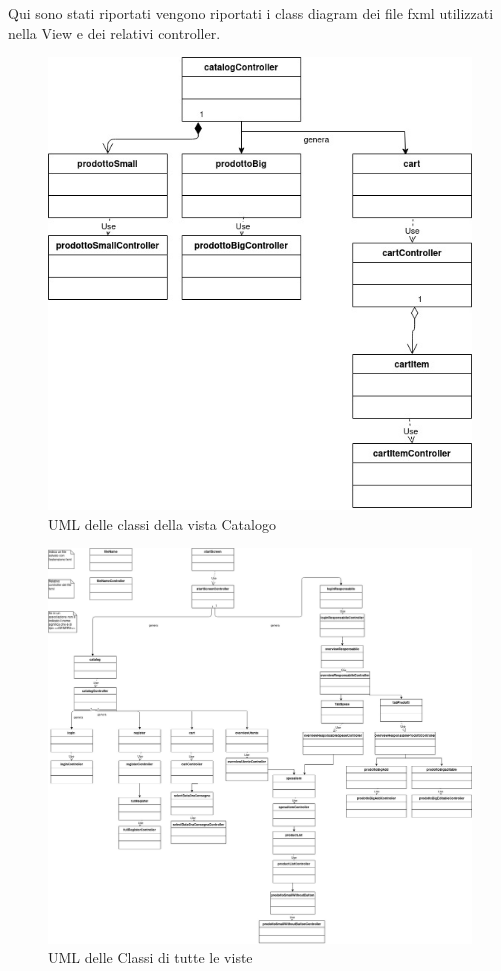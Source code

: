 \documentclass{article}
\begin{document}
Qui sono stati riportati vengono riportati i class diagram dei file fxml utilizzati nella View e dei relativi controller.
\begin{figure}[h!]
	\centering
	\includegraphics[width=\textwidth]{UmlCatalog.jpg}
	\caption{UML delle classi della vista Catalogo}
	\label{fig:UmlCatalog}
\end{figure}

\begin{figure}[h!]
	\centering
	\includegraphics[width=\textwidth]{UmlInterfaccie.jpg}
	\caption{UML delle Classi di tutte le viste}
	\label{fig:UmlInterfaccie}
\end{figure}
\end{document}
